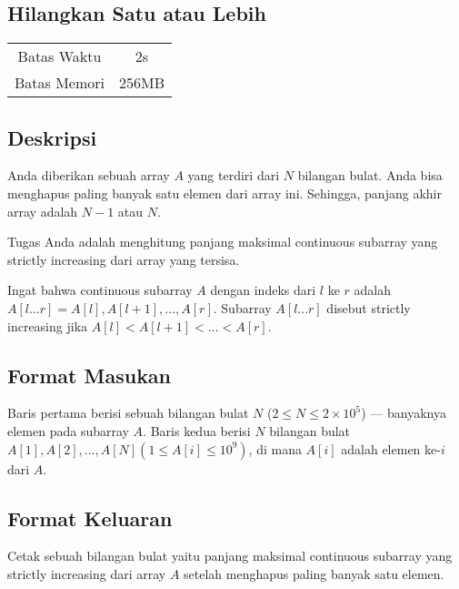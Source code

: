 \documentclass{article}
\begin{document}
\begin{center}

    
    \section*{Hilangkan Satu atau Lebih} %

    \begin{tabular}{ | c c | }
        \hline
        Batas Waktu  & 2s \\    %
        Batas Memori & 256MB \\  %
        \hline
    \end{tabular}
\end{center}

\subsection*{Deskripsi}

Anda diberikan sebuah array $A$ yang terdiri dari $N$ bilangan bulat. Anda bisa menghapus paling banyak satu elemen dari array ini. Sehingga, panjang akhir array adalah $N - 1$ atau $N$.

Tugas Anda adalah menghitung panjang maksimal continuous subarray yang strictly increasing dari array yang tersisa.

Ingat bahwa continuous subarray $A$ dengan indeks dari $l$ ke $r$ adalah $A[l…r] = A[l], A[l + 1], ..., A[r]$. Subarray $A[l...r]$ disebut strictly increasing jika $A[l] < A[l+1] < ... < A[r]$.

\subsection*{Format Masukan}

Baris pertama berisi sebuah bilangan bulat $N$ ($2 \leq N \leq 2 \times 10^{5}$) — banyaknya elemen pada subarray $A$. Baris kedua berisi $N$ bilangan bulat $A[1], A[2], ..., A[N] (1 \leq A[i] \leq 10^{9})$, di mana $A[i]$ adalah elemen ke-$i$ dari $A$.

\subsection*{Format Keluaran}

Cetak sebuah bilangan bulat yaitu panjang maksimal continuous subarray yang strictly increasing dari array $A$ setelah menghapus paling banyak satu elemen.
\end{document}
